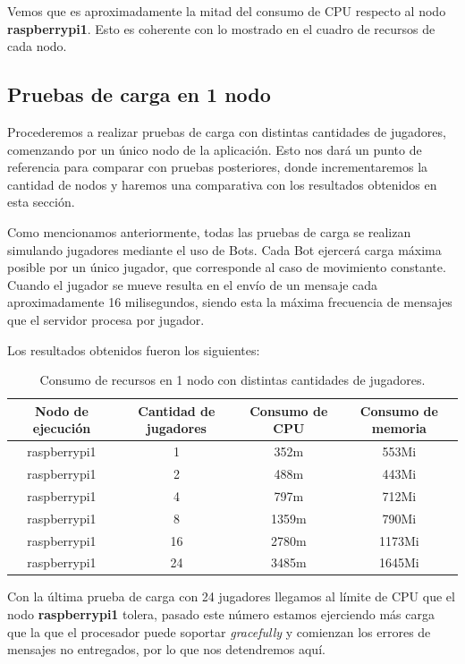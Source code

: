 Vemos que es aproximadamente la mitad del consumo de CPU respecto al nodo \textbf{raspberrypi1}. Esto es coherente con lo mostrado en el cuadro de recursos de cada
nodo.

\subsection{Pruebas de carga en 1 nodo}

\noindent Procederemos a realizar pruebas de carga con distintas cantidades de jugadores, comenzando por un único nodo de la aplicación. Esto
nos dará un punto de referencia para comparar con pruebas posteriores, donde incrementaremos la cantidad de nodos y haremos una comparativa con los resultados
obtenidos en esta sección.

Como mencionamos anteriormente, todas las pruebas de carga se realizan simulando jugadores mediante el uso de Bots. Cada Bot ejercerá carga máxima posible por un único jugador, que corresponde
al caso de movimiento constante. Cuando el jugador se mueve resulta en el envío de un mensaje cada aproximadamente 16 milisegundos, siendo esta la máxima frecuencia de mensajes que el servidor
procesa por jugador.

Los resultados obtenidos fueron los siguientes:

\begin{table}[h]
\centering
\begin{tabular}{|c|c|c|c|}
    \hline
    \textbf{Nodo de ejecución} & \textbf{Cantidad de jugadores} & \textbf{Consumo de CPU} & \textbf{Consumo de memoria} \\
    \hline
    raspberrypi1 & 1 & 352m & 553Mi \\
    \hline
    raspberrypi1 & 2 & 488m & 443Mi \\
    \hline
    raspberrypi1 & 4 & 797m & 712Mi \\
    \hline
    raspberrypi1 & 8 & 1359m & 790Mi \\
    \hline
    raspberrypi1 & 16 & 2780m & 1173Mi \\
    \hline
    raspberrypi1 & 24 & 3485m & 1645Mi \\
    \hline
\end{tabular}
\caption{Consumo de recursos en 1 nodo con distintas cantidades de jugadores.}
\end{table}

Con la última prueba de carga con 24 jugadores llegamos al límite de CPU que el nodo \textbf{raspberrypi1} tolera, pasado este número estamos ejerciendo más carga que la que el procesador
puede soportar \textit{gracefully} y comienzan los errores de mensajes no entregados, por lo que nos detendremos aquí. 

